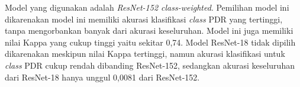 Model yang digunakan adalah \emph{ResNet-152 class-weighted}. Pemilihan model ini dikarenakan model ini memiliki akurasi klasifikasi \emph{class} PDR yang tertinggi, tanpa mengorbankan banyak dari akurasi keseluruhan. Model ini juga memiliki nilai Kappa yang cukup tinggi yaitu sekitar 0,74. Model ResNet-18 tidak dipilih dikarenakan meskipun nilai Kappa tertinggi, namun akurasi klasifikasi untuk \emph{class} PDR cukup rendah dibanding ResNet-152, sedangkan akurasi keseluruhan dari ResNet-18 hanya unggul 0,0081 dari ResNet-152.